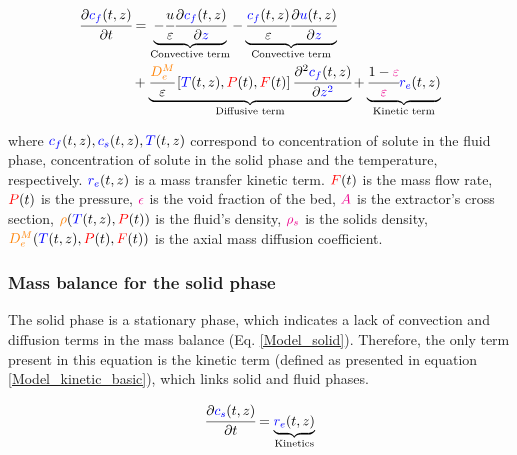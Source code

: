 \documentclass[../Article_Model_Parameters.tex]{subfiles}
\begin{document}
	{\footnotesize
		\begin{align} 
			\label{Model_fluid}
			\cfrac{\partial {\color{blue}c_f}(t,z)}{\partial t} &	=  \underbrace{- \cfrac{u}{\varepsilon} \cfrac{\partial {\color{blue}c_f}(t,z)}{\partial {\color{blue}z}}}_{\text{Convective term}} - \underbrace{ \cfrac{ {\color{blue}c_f}(t,z) }{\varepsilon} \cfrac{\partial {\color{blue}u}(t,z)}{\partial {\color{blue}z}}}_{\text{Convective term}} \nonumber \\
			&+ \underbrace{ \cfrac{ {\color{orange}D^M_e} }{\varepsilon} \left[{\color{blue}T}(t,z),{\color{red}P}(t),{\color{red}F}(t)\right] \cfrac{\partial^2 {\color{blue}c_f}(t,z)}{\partial {\color{blue}z^2}} }_{\text{Diffusive term}} 
			+ \underbrace{ \cfrac{1-{\color{magenta}\varepsilon}}{{\color{magenta}\varepsilon}} {\color{blue}r_e}(t,z) }_{\text{Kinetic term}} 
	\end{align} }
	
	where ${\color{blue}c_f}(t,z), {\color{blue}c_s}(t,z), {\color{blue}T}(t,z)$ correspond to concentration of solute in the fluid phase, concentration of solute in the solid phase and the temperature, respectively. ${\color{blue}r_e}(t,z)$ is a mass transfer kinetic term. ${\color{red}F}(t)$ is the mass flow rate, ${\color{red}P}(t)$ is the pressure, ${\color{magenta}\epsilon}$ is the void fraction of the bed, ${\color{magenta}A}$ is the extractor’s cross section, ${\color{orange}\rho}({\color{blue}T}(t,z),{\color{red}P}(t))$ is the fluid's density, ${\color{magenta}\rho_s}$ is the solids density, ${\color{orange}D^M_e}({\color{blue}T}(t,z),{\color{red}P}(t),{\color{red}F}(t))$ is the axial mass diffusion coefficient.
	
	\subsubsection{Mass balance for the solid phase} \label{Mass_balance_solid}
	The solid phase is a stationary phase, which indicates a lack of convection and diffusion terms in the mass balance (Eq.  \ref{Model_solid}). Therefore, the only term present in this equation is the kinetic term (defined as presented in equation \ref{Model_kinetic_basic}), which links solid and fluid phases.
	
	{\footnotesize
		\begin{equation} 
			\label{Model_solid}
					\cfrac{\partial {\color{blue}c_s}(t,z)}{\partial t} = \underbrace{ {\color{blue}r_e}(t,z) }_{\text{Kinetics}}
			\end{equation} }
			
\end{document}
